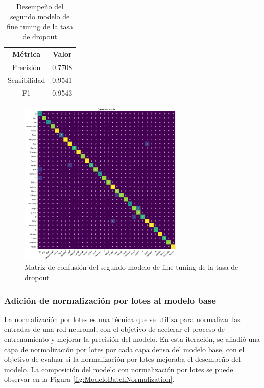 \begin{table}[H]
    \centering
    \begin{tabular}{|c|c|}
        \hline
        \textbf{Métrica} & \textbf{Valor} \\
        \hline
        Precisión & 0.7708 \\
        \hline
        Sensibilidad & 0.9541 \\
        \hline
        F1 & 0.9543 \\
        \hline
    \end{tabular}
    \caption{Desempeño del segundo modelo de fine tuning de la tasa de dropout}
    \label{tab:DesempeñoModeloDropoutV3}
\end{table}

\begin{figure}[H]
    \centering
    \includegraphics[width=0.7\textwidth]{figuras/modelDropoutV3CM.png}
    \caption{Matriz de confusión del segundo modelo de fine tuning de la tasa de dropout}
    \label{fig:CMModeloDropoutV3}
\end{figure}

\subsubsection{Adición de normalización por lotes al modelo base}

La normalización por lotes es una técnica que se utiliza para normalizar las entradas de una red neuronal, con el objetivo de acelerar el proceso de entrenamiento y mejorar la precisión del modelo.
En esta iteración, se añadió una capa de normalización por lotes por cada capa densa del modelo base, con el objetivo de evaluar si la normalización por lotes mejoraba el desempeño del modelo.
La composición del modelo con normalización por lotes se puede observar en la Figura \ref{fig:ModeloBatchNormalization}.


